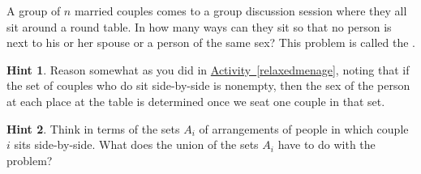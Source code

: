\documentclass{book}
\begin{document}
\setcounter{cpjt}{227}
\addtocounter{cpjt}{-1}
\begin{activity}\label{activity-220}
\hypertarget{p-1212}{}%
A group of \(n\) married couples comes to a group discussion session where they all sit around a round table. In how many ways can they sit so that no person is next to his or her spouse or a person of the same sex? This problem is called the .%
\par\smallskip%
\noindent\textbf{Hint 1}.\hypertarget{hint-148}{}\quad%
\hypertarget{p-1213}{}%
Reason somewhat as you did in \hyperref[relaxedmenage]{Activity~\ref{relaxedmenage}}, noting that if the set of couples who do sit side-by-side is nonempty, then the sex of the person at each place at the table is determined once we seat one couple in that set.%
\par\smallskip%
\noindent\textbf{Hint 2}.\hypertarget{hint-149}{}\quad%
\hypertarget{p-1214}{}%
Think in terms of the sets \(A_i\) of arrangements of people in which couple \(i\) sits side-by-side. What does the union of the sets \(A_i\) have to do with the problem?%
\par\smallskip%
\noindent\end{activity}

\clearpage
\end{document}
